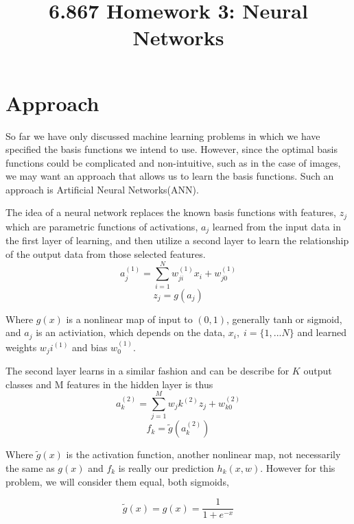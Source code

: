 \documentclass[12pt, twocolumn]{article}
\begin{document}
\title{6.867 Homework 3: Neural Networks}
\maketitle

\section{Approach}
So far we have only discussed machine learning problems in which we have specified the basis functions we intend to use. However, since the optimal basis functions could be complicated and non-intuitive, such as in the case of images, we may want an approach that allows us to learn the basis functions. Such an approach is Artificial Neural Networks(ANN). 

The idea of a neural network replaces the known basis functions with features, $z_j$ which are parametric functions of activations, $a_j$ learned from the input data in the first layer of learning, and then utilize a second layer to learn the relationship of the output data from those selected features. 
\begin{equation}
a_j^{(1)}= \sum_{i=1}^N w_{ji}^{(1)} x_i+w_{j0}^{(1)}
\end{equation}
\begin{equation}
z_j= g(a_j)
\end{equation}

Where $g(x)$ is a nonlinear map of input to $(0,1)$, generally tanh or sigmoid, and $a_j$ is an activiation, which depends on the data, $x_i, \; i=\{1,...N\}$  and learned weights $w_ji^{(1)}$ and bias $w_0^{(1)}$. 

The second layer learns in a similar fashion and can be describe for $K$ output classes and M features in the  hidden layer  is thus 
\begin{equation}
a_k^{(2)}= \sum_{j=1}^M w_jk^{(2)} z_j+w_{k0}^{(2)}
\end{equation}
\begin{equation}
f_k= \tilde{g}(a_k^{(2)})
\end{equation}
 
Where $\tilde{g}(x)$ is the activation function, another nonlinear map, not necessarily the same as $g(x)$ and $f_k$ is really our prediction $h_k(x,w)$. However for this problem, we will consider them equal, both sigmoids, 

\begin{equation}
\tilde{g}(x)= g(x) = \frac{1}{ 1+e^{-x}}
\end{equation}
\end{document}
